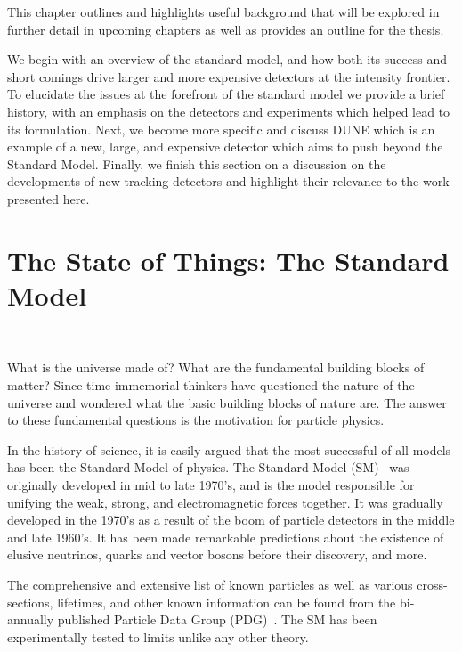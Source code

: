This chapter outlines and highlights useful background that will be explored in further detail in upcoming chapters as well as provides an outline for the thesis.

We begin with an overview of the standard model, and how both its success and short comings drive larger and more expensive detectors at the intensity frontier.
To elucidate the issues at the forefront of the standard model we provide a brief history, with an emphasis on the detectors and experiments which helped lead to its formulation.
Next, we become more specific and discuss DUNE which is an example of a new, large, and expensive detector which aims to push beyond the Standard Model.
Finally, we finish this section on a discussion on the developments of new tracking detectors and highlight their relevance to the work presented here.

\section{The State of Things: The Standard Model}
~\label{sec:intro_now}

What is the universe made of?
What are the fundamental building blocks of matter?
Since time immemorial thinkers have questioned the nature of the universe and wondered what the basic building blocks of nature are.
The answer to these fundamental questions is the motivation for particle physics.

In the history of science, it is easily argued that the most successful of all models has been the Standard Model of physics.
The Standard Model (SM)~\citep{GLASHOW1961579, salam1964electromagnetic, weinberg1967model} was originally developed in mid to late 1970's, and is the model responsible for unifying the weak, strong, and electromagnetic forces together.
It was gradually developed in the 1970's as a result of the boom of particle detectors in the middle and late 1960's.
It has been made remarkable predictions about the existence of elusive neutrinos, quarks and vector bosons before their discovery, and more.

The comprehensive and extensive list of known particles as well as various cross-sections, lifetimes, and other known information can be found from the bi-annually published Particle Data Group (PDG)~\citep{Workman:2022ynf}.
The SM has been experimentally tested to limits unlike any other theory.

